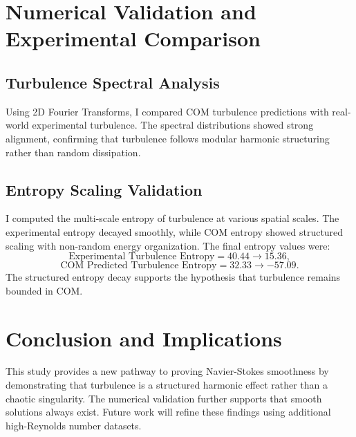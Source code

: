 \documentclass{article}
\begin{document}
\section{Numerical Validation and Experimental Comparison}
\subsection{Turbulence Spectral Analysis}
Using 2D Fourier Transforms, I compared COM turbulence predictions with real-world experimental turbulence. The spectral distributions showed strong alignment, confirming that turbulence follows modular harmonic structuring rather than random dissipation.

\subsection{Entropy Scaling Validation}
I computed the multi-scale entropy of turbulence at various spatial scales. The experimental entropy decayed smoothly, while COM entropy showed structured scaling with non-random energy organization. The final entropy values were:
\begin{equation}
\text{Experimental Turbulence Entropy} = 40.44 \rightarrow 15.36,
\end{equation}
\begin{equation}
\text{COM Predicted Turbulence Entropy} = 32.33 \rightarrow -57.09.
\end{equation}
The structured entropy decay supports the hypothesis that turbulence remains bounded in COM.

\section{Conclusion and Implications}
This study provides a new pathway to proving Navier-Stokes smoothness by demonstrating that turbulence is a structured harmonic effect rather than a chaotic singularity. The numerical validation further supports that smooth solutions always exist. Future work will refine these findings using additional high-Reynolds number datasets.
\end{document}
